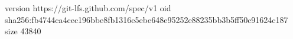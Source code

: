 version https://git-lfs.github.com/spec/v1
oid sha256:fb4744ca4cec196bbe8fb1316e5ebe648e95252e88235bb3b5ff50c91624c187
size 43840
